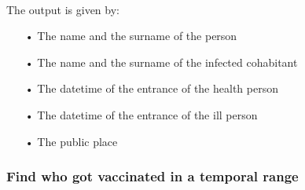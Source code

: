 \documentclass[a4paper,12pt]{article}
\begin{document}
\paragraph{} The output is given by: 
\begin{itemize}
\item[•] The name and the surname of the person
\item[•] The name and the surname of the infected cohabitant
\item[•] The datetime of the entrance of the health person
\item[•] The datetime of the entrance of the ill person
\item[•] The public place
\begin{center}
\end{center}
\end{itemize}

\subsubsection{Find who got vaccinated in a temporal range}
\end{document}
